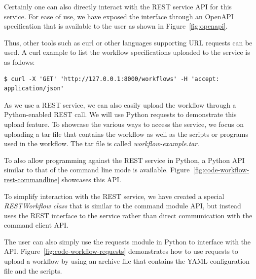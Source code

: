 \documentclass[sigplan,screen]{acmart}
\begin{document}
Certainly one can also directly interact with the REST service API for
this service. For ease of use, we have exposed the interface through
an OpenAPI specification that is available to the user as shown in
Figure~\ref{fig:openapi}.

Thus, other tools such as curl or other languages supporting URL
requests can be used. A curl example to list the workflow
specifications uploaded to the service is as follows:

{\scriptsize
\begin{verbatim}
$ curl -X 'GET' 'http://127.0.0.1:8000/workflows' -H 'accept: application/json'
\end{verbatim}}

As we use a REST service, we can also easily upload the workflow
through a Python-enabled REST call. We will use Python requests to
demonstrate this upload feature. To showcase the various ways to
access the service, we focus on uploading a tar file that contains the
workflow as well as the scripts or programs used in the workflow. The
tar file is called {\em workflow-example.tar}.

To also allow programming against the REST service in Python, a Python
API similar to that of the command line mode is
available. Figure~\ref{fig:code-workflow-rest-commandline} showcases
this API.

To simplify interaction with the REST service, we have created a special
{\em RESTWorkflow class} that is similar to the command module API,
but instead uses the REST interface to the service rather than direct
communication with the command client API.

The user can also simply use the requests module in Python to
interface with the API. Figure~\ref{fig:code-workflow-requests}
demonstrates how to use requests to upload a workflow by using an
archive file that contains the YAML configuration file and the
scripts.
\end{document}
